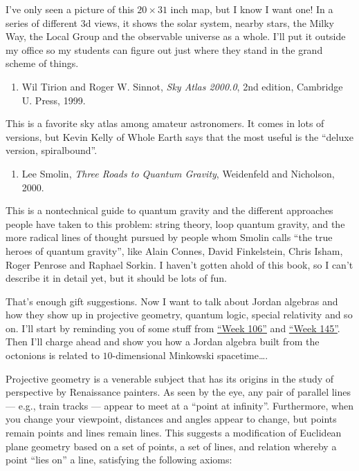 \documentclass{article}
\def\tightlist{}
\begin{document}
I've only seen a picture of this \(20\times31\) inch map, but I know I
want one! In a series of different 3d views, it shows the solar system,
nearby stars, the Milky Way, the Local Group and the observable universe
as a whole. I'll put it outside my office so my students can figure out
just where they stand in the grand scheme of things.

\begin{enumerate}
\def\labelenumi{\arabic{enumi})}
\setcounter{enumi}{1}
\tightlist
\item
  Wil Tirion and Roger W. Sinnot, \emph{Sky Atlas 2000.0}, 2nd edition,
  Cambridge U. Press, 1999.
\end{enumerate}

This is a favorite sky atlas among amateur astronomers. It comes in lots
of versions, but Kevin Kelly of Whole Earth says that the most useful is
the ``deluxe version, spiralbound''.

\begin{enumerate}
\def\labelenumi{\arabic{enumi})}
\setcounter{enumi}{2}
\tightlist
\item
  Lee Smolin, \emph{Three Roads to Quantum Gravity}, Weidenfeld and
  Nicholson, 2000.
\end{enumerate}

This is a nontechnical guide to quantum gravity and the different
approaches people have taken to this problem: string theory, loop
quantum gravity, and the more radical lines of thought pursued by people
whom Smolin calls ``the true heroes of quantum gravity'', like Alain
Connes, David Finkelstein, Chris Isham, Roger Penrose and Raphael
Sorkin. I haven't gotten ahold of this book, so I can't describe it in
detail yet, but it should be lots of fun.

That's enough gift suggestions. Now I want to talk about Jordan algebras
and how they show up in projective geometry, quantum logic, special
relativity and so on. I'll start by reminding you of some stuff from
\protect\hyperlink{week106}{``Week 106''} and
\protect\hyperlink{week145}{``Week 145''}. Then I'll charge ahead and
show you how a Jordan algebra built from the octonions is related to
\(10\)-dimensional Minkowski spacetime\ldots.

Projective geometry is a venerable subject that has its origins in the
study of perspective by Renaissance painters. As seen by the eye, any
pair of parallel lines --- e.g., train tracks --- appear to meet at a
``point at infinity''. Furthermore, when you change your viewpoint,
distances and angles appear to change, but points remain points and
lines remain lines. This suggests a modification of Euclidean plane
geometry based on a set of points, a set of lines, and relation whereby
a point ``lies on'' a line, satisfying the following axioms:
\end{document}
